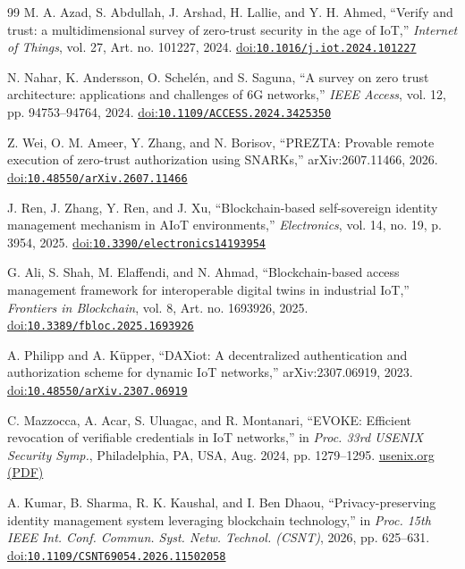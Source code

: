 \begin{thebibliography}{99}
M. A. Azad, S. Abdullah, J. Arshad, H. Lallie, and Y. H. Ahmed, ``Verify and trust: a multidimensional survey of zero-trust security in the age of IoT,'' \emph{Internet of Things}, vol. 27, Art. no. 101227, 2024. \href{https://doi.org/10.1016/j.iot.2024.101227}{doi:\nolinkurl{10.1016/j.iot.2024.101227}}

N. Nahar, K. Andersson, O. Schel\'en, and S. Saguna, ``A survey on zero trust architecture: applications and challenges of 6G networks,'' \emph{IEEE Access}, vol. 12, pp. 94753--94764, 2024. \href{https://doi.org/10.1109/ACCESS.2024.3425350}{doi:\nolinkurl{10.1109/ACCESS.2024.3425350}}

Z. Wei, O. M. Ameer, Y. Zhang, and N. Borisov, ``PREZTA: Provable remote execution of zero-trust authorization using SNARKs,'' arXiv:2607.11466, 2026. \href{https://doi.org/10.48550/arXiv.2607.11466}{doi:\nolinkurl{10.48550/arXiv.2607.11466}}

J. Ren, J. Zhang, Y. Ren, and J. Xu, ``Blockchain-based self-sovereign identity management mechanism in AIoT environments,'' \emph{Electronics}, vol. 14, no. 19, p. 3954, 2025. \href{https://doi.org/10.3390/electronics14193954}{doi:\nolinkurl{10.3390/electronics14193954}}

G. Ali, S. Shah, M. Elaffendi, and N. Ahmad, ``Blockchain-based access management framework for interoperable digital twins in industrial IoT,'' \emph{Frontiers in Blockchain}, vol. 8, Art. no. 1693926, 2025. \href{https://doi.org/10.3389/fbloc.2025.1693926}{doi:\nolinkurl{10.3389/fbloc.2025.1693926}}

A. Philipp and A. K\"upper, ``DAXiot: A decentralized authentication and authorization scheme for dynamic IoT networks,'' arXiv:2307.06919, 2023. \href{https://doi.org/10.48550/arXiv.2307.06919}{doi:\nolinkurl{10.48550/arXiv.2307.06919}}

C. Mazzocca, A. Acar, S. Uluagac, and R. Montanari, ``EVOKE: Efficient revocation of verifiable credentials in IoT networks,'' in \emph{Proc. 33rd USENIX Security Symp.}, Philadelphia, PA, USA, Aug. 2024, pp. 1279--1295. \href{https://www.usenix.org/system/files/usenixsecurity24-mazzocca.pdf}{usenix.org (PDF)}

A. Kumar, B. Sharma, R. K. Kaushal, and I. Ben Dhaou, ``Privacy-preserving identity management system leveraging blockchain technology,'' in \emph{Proc. 15th IEEE Int. Conf. Commun. Syst. Netw. Technol. (CSNT)}, 2026, pp. 625--631. \href{https://doi.org/10.1109/CSNT69054.2026.11502058}{doi:\nolinkurl{10.1109/CSNT69054.2026.11502058}}


\end{thebibliography}
